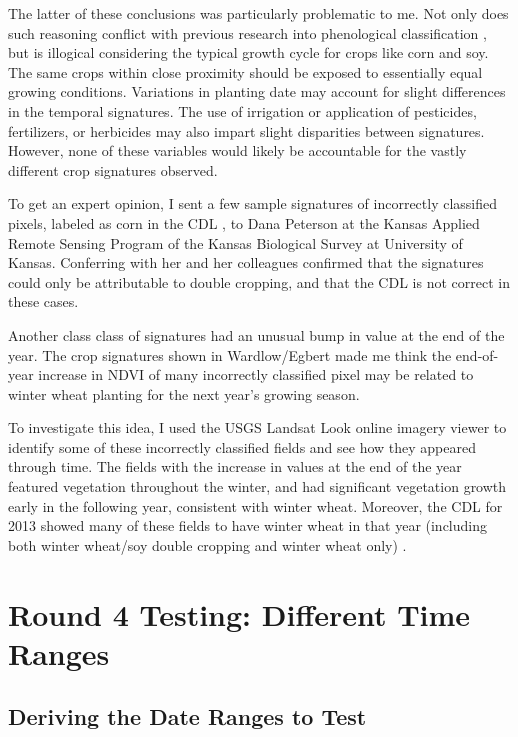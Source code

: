 The latter of these conclusions was particularly problematic to me. Not only does such reasoning conflict with previous research into phenological classification , but is illogical considering the typical growth cycle for crops like corn and soy. The same crops within close proximity should be exposed to essentially equal growing conditions. Variations in planting date may account for slight differences in the temporal signatures. The use of irrigation or application of pesticides, fertilizers, or herbicides may also impart slight disparities between signatures. However, none of these variables would likely be accountable for the vastly different crop signatures observed.

To get an expert opinion, I sent a few sample signatures of incorrectly classified pixels, labeled as corn in the CDL , to Dana Peterson at the Kansas Applied Remote Sensing Program of the Kansas Biological Survey at University of Kansas. Conferring with her and her colleagues confirmed that the signatures could only be attributable to double cropping, and that the CDL is not correct in these cases. 

Another class class of signatures had an unusual bump in value at the end of the year. The crop signatures shown in Wardlow/Egbert made me think the end-of-year increase in NDVI of many incorrectly classified pixel may be related to winter wheat planting for the next year’s growing season.

To investigate this idea, I used the USGS Landsat Look online imagery viewer to identify some of these incorrectly classified fields and see how they appeared through time. The fields with the increase in values at the end of the year featured vegetation throughout the winter, and had significant vegetation growth early in the following year, consistent with winter wheat. Moreover, the CDL for 2013 showed many of these fields to have winter wheat in that year (including both winter wheat/soy double cropping and winter wheat only) .

\section{Round 4 Testing: Different Time Ranges}
\label{appendix:testing:r4}

\subsection*{Deriving the Date Ranges to Test}

